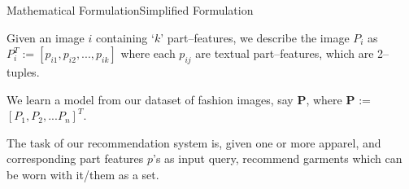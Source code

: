 \documentclass[10pt]{beamer}
\begin{document}

\begin{frame}{Mathematical Formulation}{Simplified Formulation}
\begin{block}{}
Given an image $i$ containing `$k$' part--features, we describe the image $P_i$ as $P_i^{T} := [p_{i1}, p_{i2}, ..., p_{ik}]$ where each $p_{ij}$ are textual part--features, which are 2--tuples.
\end{block}
\pause
\begin{block}{}
We learn a model from our dataset of fashion images, say \textbf{P}, where \textbf{P} := $[P_1, P_2, ... P_n]^{T}$.
\end{block}
\pause
\begin{block}{}
The task of our recommendation system is, given one or more apparel, and corresponding part features $p$'s as input query, recommend garments which can be worn with it/them as a set.
\end{block}
\end{frame}     

\end{document}

